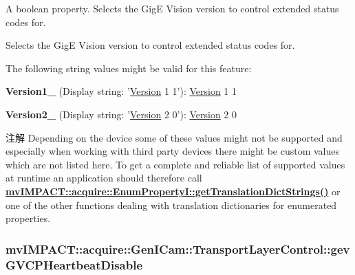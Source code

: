 A boolean property. Selects the Gig\+E Vision version to control extended status codes for. 

Selects the Gig\+E Vision version to control extended status codes for.

The following string values might be valid for this feature\+:
\begin{DoxyItemize}
\item {\bfseries Version1\+\_} (Display string\+: '\hyperlink{struct_version}{Version} 1 1')\+: \hyperlink{struct_version}{Version} 1 1
\item {\bfseries Version2\+\_} (Display string\+: '\hyperlink{struct_version}{Version} 2 0')\+: \hyperlink{struct_version}{Version} 2 0
\end{DoxyItemize}

\begin{DoxyNote}{注解}
Depending on the device some of these values might not be supported and especially when working with third party devices there might be custom values which are not listed here. To get a complete and reliable list of supported values at runtime an application should therefore call {\bfseries \hyperlink{classmv_i_m_p_a_c_t_1_1acquire_1_1_enum_property_i_a0ba6ccbf5ee69784d5d0b537924d26b6}{mv\+I\+M\+P\+A\+C\+T\+::acquire\+::\+Enum\+Property\+I\+::get\+Translation\+Dict\+Strings()}} or one of the other functions dealing with translation dictionaries for enumerated properties. 
\end{DoxyNote}
\hypertarget{classmv_i_m_p_a_c_t_1_1acquire_1_1_gen_i_cam_1_1_transport_layer_control_a77e81761dc28f1064f3332f384b3977e}{
\subsubsection[{gev\+G\+V\+C\+P\+Heartbeat\+Disable}]{ mv\+I\+M\+P\+A\+C\+T\+::acquire\+::\+Gen\+I\+Cam\+::\+Transport\+Layer\+Control\+::gev\+G\+V\+C\+P\+Heartbeat\+Disable}}\label{classmv_i_m_p_a_c_t_1_1acquire_1_1_gen_i_cam_1_1_transport_layer_control_a77e81761dc28f1064f3332f384b3977e}


